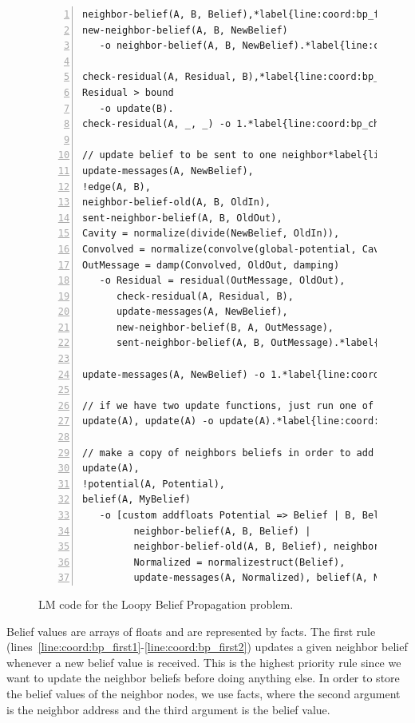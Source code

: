 \begin{figure}[h!]
\begin{Verbatim}[numbers=left, fontsize=\codesize, commandchars=\*\{\}]
neighbor-belief(A, B, Belief),*label{line:coord:bp_first1}
new-neighbor-belief(A, B, NewBelief)
   -o neighbor-belief(A, B, NewBelief).*label{line:coord:bp_first2}

check-residual(A, Residual, B),*label{line:coord:bp_check1}
Residual > bound
   -o update(B).
check-residual(A, _, _) -o 1.*label{line:coord:bp_check2}

// update belief to be sent to one neighbor*label{line:coord:bp_iterate1}
update-messages(A, NewBelief),
!edge(A, B),
neighbor-belief-old(A, B, OldIn),
sent-neighbor-belief(A, B, OldOut),
Cavity = normalize(divide(NewBelief, OldIn)),
Convolved = normalize(convolve(global-potential, Cavity)),
OutMessage = damp(Convolved, OldOut, damping)
   -o Residual = residual(OutMessage, OldOut),
      check-residual(A, Residual, B),
      update-messages(A, NewBelief),
      new-neighbor-belief(B, A, OutMessage),
      sent-neighbor-belief(A, B, OutMessage).*label{line:coord:bp_iterate2}

update-messages(A, NewBelief) -o 1.*label{line:coord:bp_iterate_final}

// if we have two update functions, just run one of them*label{line:coord:bp_last1}
update(A), update(A) -o update(A).*label{line:coord:bp_update}

// make a copy of neighbors beliefs in order to add them up*label{line:coord:bp_update1}
update(A),
!potential(A, Potential),
belief(A, MyBelief)
   -o [custom addfloats Potential => Belief | B, Belief |*label{line:coord:bp_agg1}
         neighbor-belief(A, B, Belief) |
         neighbor-belief-old(A, B, Belief), neighbor-belief(A, B, Belief) |
         Normalized = normalizestruct(Belief),
         update-messages(A, Normalized), belief(A, Normalized)].*label{line:coord:bp_last2}*label{line:coord:bp_update2}*label{line:coord:bp_agg2}
\end{Verbatim}
\caption{LM code for the Loopy Belief Propagation problem.}
\label{code:coordination:bp}
\end{figure}

Belief values are arrays of floats and are represented by  facts.
The first rule (lines~\ref{line:coord:bp_first1}-\ref{line:coord:bp_first2})
updates a given neighbor belief whenever a new belief value is received. This is
the highest priority rule since we want to update the neighbor beliefs before
doing anything else. In order to store the belief values of the neighbor nodes,
we use  facts, where the second argument is the neighbor
address and the third argument is the belief value.

